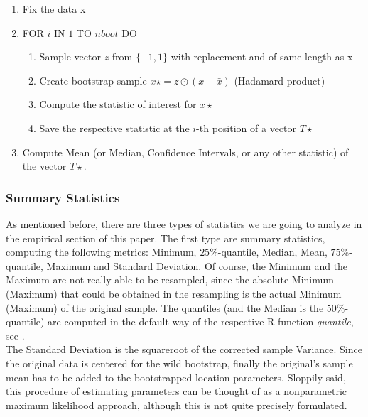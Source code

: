 \begin{enumerate}
	\item Fix the data x
	\item FOR $i$ IN $1$ TO $nboot$ DO
	\begin{enumerate}
		\item Sample vector $z$ from $\{-1,1\}$ with replacement and of same length as x
		\item Create bootstrap sample $x\star = z \odot (x - \bar{x})$ (Hadamard product)
		\item Compute the statistic of interest for $x\star$
		\item Save the respective statistic at the $i$-th position of a vector $T\star$
	\end{enumerate}
	\item Compute Mean (or Median, Confidence Intervals, or any other statistic) of the vector $T\star$.
\end{enumerate}
	\subsubsection*{Summary Statistics}
As mentioned before, there are three types of statistics we are going to analyze in the empirical section of this paper. The first type are summary statistics, computing the following metrics: Minimum, $25\%$-quantile, Median, Mean, $75\%$-quantile, Maximum and Standard Deviation. Of course, the Minimum and the Maximum are not really able to be resampled, since the absolute Minimum (Maximum) that could be obtained in the resampling is the actual Minimum (Maximum) of the original sample. The quantiles (and the Median is the $50\%$-quantile) are computed in the default way of the respective R-function \textit{quantile}, see \citet{r}. \\ The Standard Deviation is the squareroot of the corrected sample Variance. Since the original data is centered for the wild bootstrap, finally the original's sample mean has to be added to the bootstrapped location parameters. Sloppily said, this procedure of estimating parameters can be thought of as a nonparametric maximum likelihood approach, although this is not quite precisely formulated.

